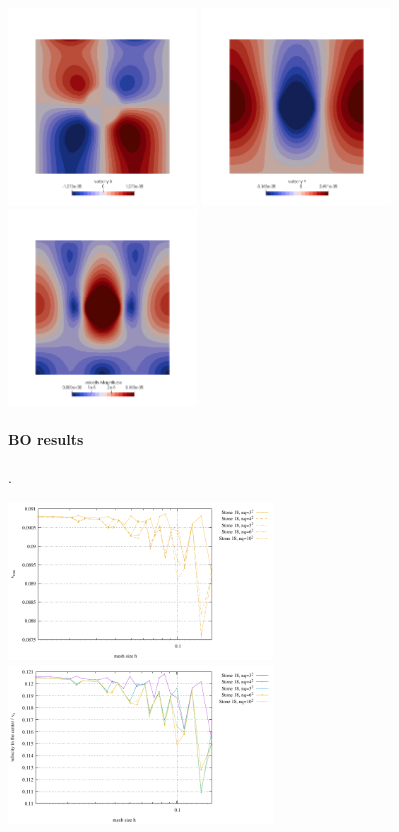 \begin{center}
\includegraphics[width=5cm]{images/stokes_sphere2D/aspect_OT_amr/u}
\includegraphics[width=5cm]{images/stokes_sphere2D/aspect_OT_amr/v}
\includegraphics[width=5cm]{images/stokes_sphere2D/aspect_OT_amr/vel}
\end{center}



\newpage
\paragraph{BO results}.



\includegraphics[width=7cm]{images/stokes_sphere2D/vrms_BO}
\includegraphics[width=7cm]{images/stokes_sphere2D/center_velocity_BO}

